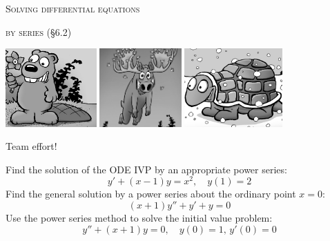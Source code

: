 \documentclass[12pt]{article}
\newcommand{\ds}{\displaystyle}
\begin{document}
\renewcommand{\d}{\displaystyle}

\centerline{{\Large \textsc{Solving differential equations} \hspace{30mm}}}

\medskip
\centerline{{\Large \textsc{by series (\S6.2)} \hspace{33mm}}}

\vspace{-20mm}

\def\TURTLE{}

\ifdefined\BEAVER
\hfill \includegraphics[height=30mm]{figs/beaver.jpg}
\else
\ifdefined\MOOSE
\hfill \includegraphics[height=30mm]{figs/moose.jpg}
\else
\hfill \includegraphics[height=30mm]{figs/turtle.jpg}
\fi
\fi

\vspace{-6mm}
\noindent
Team effort! 

\ifdefined\BEAVER
\noindent Find the solution of the ODE IVP by an appropriate power series:
    $$y' + (x-1) y = x^2, \quad y(1) = 2$$
\else
\ifdefined\MOOSE
\noindent Find the general solution by a power series about the ordinary point $x=0$:
    $$(x+1) y'' + y' + y = 0$$
\else
\noindent Use the power series method to solve the initial value problem:
    $$\ds y'' + (x+1)  y = 0, \quad y(0)=1, \, y'(0)=0$$
\fi
\fi
\vfill
\end{document}
